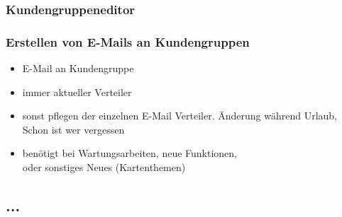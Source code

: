\subsubsection{Kundengruppeneditor}

\subsubsection{Erstellen von E-Mails an Kundengruppen}
\begin{itemize}
	\item E-Mail an Kundengruppe
	\item immer aktueller Verteiler
	\item sonst pflegen der einzelnen E-Mail Verteiler. Änderung während Urlaub, Schon ist wer vergessen
	\item benötigt bei Wartungsarbeiten, neue Funktionen,\\ oder sonstiges Neues (Kartenthemen)
\end{itemize}
\subsection{...}

